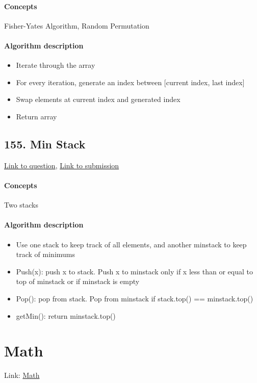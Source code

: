 \documentclass[11pt]{book}
\begin{document}
\paragraph{Concepts}
Fisher-Yates Algorithm, Random Permutation
\paragraph{Algorithm description}
\begin{itemize}
    \item Iterate through the array
    \item For every iteration, generate an index between [current index, last index]
    \item Swap elements at current index and generated index
    \item Return array
\end{itemize}

\subsection{155. Min Stack}
\href{https://leetcode.com/problems/min-stack/}{Link to question},
\href{https://leetcode.com/submissions/detail/335680451/}{Link to submission}
\paragraph{Concepts}
Two stacks
\paragraph{Algorithm description}
\begin{itemize}
    \item Use one stack to keep track of all elements, and another minstack to keep track of minimums
    \item Push(x): push x to stack. Push x to minstack only if x less than or equal to top of minstack or if minstack is empty
    \item Pop(): pop from stack. Pop from minstack if stack.top() == minstack.top()
    \item getMin(): return minstack.top()
\end{itemize}

\newpage

\section{Math}
Link: \href{https://leetcode.com/explore/featured/card/top-interview-questions-easy/102/math/}{Math}
\end{document}
